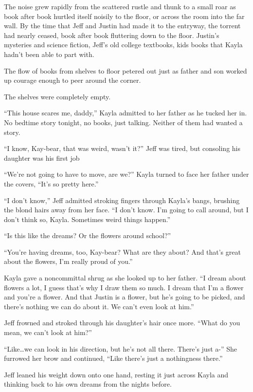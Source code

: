 The noise grew rapidly from the scattered rustle and thunk to a small roar as book after book hurtled itself noisily to the floor, or across the room into the far wall.  By the time that Jeff and Justin had made it to the entryway, the torrent had nearly ceased, book after book fluttering down to the floor.  Justin's mysteries and science fiction, Jeff's old college textbooks, kids books that Kayla hadn't been able to part with.

The flow of books from shelves to floor petered out just as father and son worked up courage enough to peer around the corner.

The shelves were completely empty.

\secdiv

``This house scares me, daddy,'' Kayla admitted to her father as he tucked her in.  No bedtime story tonight, no books, just talking.  Neither of them had wanted a story.

``I know, Kay-bear, that was weird, wasn't it?''  Jeff was tired, but consoling his daughter was his first job

``We're not going to have to move, are we?''  Kayla turned to face her father under the covers, ``It's so pretty here.''

``I don't know,'' Jeff admitted stroking fingers through Kayla's bangs, brushing the blond hairs away from her face.  ``I don't know.  I'm going to call around, but I don't think so, Kayla.  Sometimes weird things happen.''

``Is this like the dreams?  Or the flowers around school?''

``You're having dreams, too, Kay-bear?  What are they about?  And that's great about the flowers, I'm really proud of you.''

Kayla gave a noncommittal shrug as she looked up to her father.  ``I dream about flowers a lot, I guess that's why I draw them so much.  I dream that I'm a flower and you're a flower.  And that Justin is a flower, but he's going to be picked, and there's nothing we can do about it.  We can't even look at him.''

Jeff frowned and stroked through his daughter's hair once more.  ``What do you mean, we can't look at him?''

``Like\ldots{}we can look in his direction, but he's not all there.  There's just a-''  She furrowed her brow and continued, ``Like there's just a nothingness there.''

Jeff leaned his weight down onto one hand, resting it just across Kayla and thinking back to his own dreams from the nights before.

